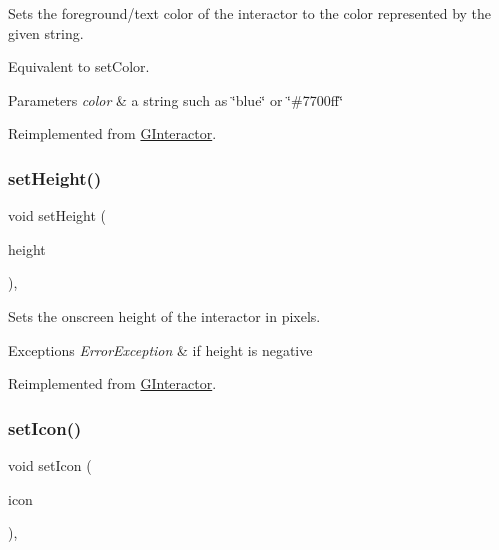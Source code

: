 Sets the foreground/text color of the interactor to the color represented by the given string. 

Equivalent to set\+Color. 
\begin{DoxyParams}{Parameters}
{\em color} & a string such as \char`\"{}blue\char`\"{} or \char`\"{}\#7700ff\char`\"{} \\
\hline
\end{DoxyParams}


Reimplemented from \mbox{\hyperlink{classsgl_1_1GInteractor_af59209aeadea6dfc6d97a2d8531f50e1}{G\+Interactor}}.

\mbox{\label{classsgl_1_1GLabel_a5eead864d1249c4406f32f9944ed1503}} 
\subsubsection{\texorpdfstring{set\+Height()}{setHeight()}}
{\footnotesize\ttfamily void set\+Height (\begin{DoxyParamCaption}\item[{double}]{height }\end{DoxyParamCaption})\hspace{0.3cm}{\ttfamily [override]}, {\ttfamily [virtual]}}



Sets the onscreen height of the interactor in pixels. 


\begin{DoxyExceptions}{Exceptions}
{\em Error\+Exception} & if height is negative \\
\hline
\end{DoxyExceptions}


Reimplemented from \mbox{\hyperlink{classsgl_1_1GInteractor_a9e280bfc4544dfaf8e4376c4e1a74357}{G\+Interactor}}.

\mbox{\label{classsgl_1_1GLabel_acca97b6c6330abded1c80521c9aca3a6}} 
\subsubsection{\texorpdfstring{set\+Icon()}{setIcon()}\hspace{0.1cm}{\footnotesize\ttfamily [1/3]}}
{\footnotesize\ttfamily void set\+Icon (\begin{DoxyParamCaption}\item[{const Q\+Icon \&}]{icon }\end{DoxyParamCaption})\hspace{0.3cm}{\ttfamily [override]}, {\ttfamily [virtual]}}



